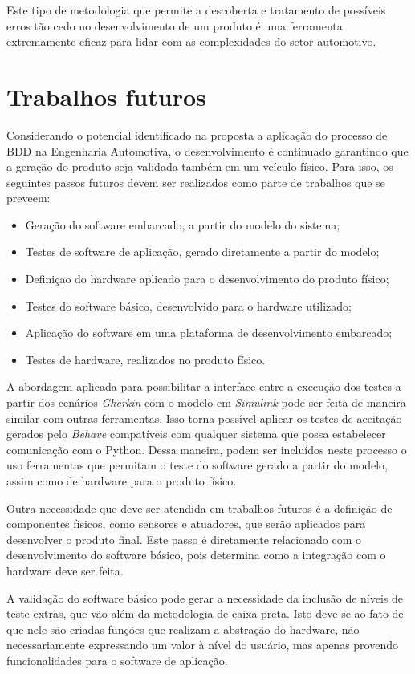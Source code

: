Este tipo de metodologia que permite a descoberta e tratamento de possíveis erros tão cedo no desenvolvimento de um produto é uma ferramenta extremamente eficaz para 
lidar com as complexidades do setor automotivo.

\section{Trabalhos futuros}

Considerando o potencial identificado na proposta a aplicação do processo de BDD na Engenharia Automotiva, o desenvolvimento é continuado garantindo que a geração do 
produto seja validada também em um veículo físico. Para isso, os seguintes passos futuros devem ser realizados como parte de trabalhos que se preveem:

\begin{itemize} 
    \item Geração do software embarcado, a partir do modelo do sistema;
    \item Testes de software de aplicação, gerado diretamente a partir do modelo;
    \item Definiçao do hardware aplicado para o desenvolvimento do produto físico;
    \item Testes do software básico, desenvolvido para o hardware utilizado;
    \item Aplicação do software em uma plataforma de desenvolvimento embarcado;
    \item Testes de hardware, realizados no produto físico.
\end{itemize}

A abordagem aplicada para possibilitar a interface entre a execução dos testes a partir dos cenários \textit{Gherkin} com o modelo em \textit{Simulink} pode 
ser feita de maneira similar com outras ferramentas. Isso torna possível aplicar os testes de aceitação gerados pelo \textit{Behave} compatíveis com qualquer 
sistema que possa estabelecer comunicação com o Python. Dessa maneira, podem ser incluídos neste processo o uso ferramentas que permitam o teste do software 
gerado a partir do modelo, assim como de hardware para o produto físico.

Outra necessidade que deve ser atendida em trabalhos futuros é a definição de componentes físicos, como sensores e atuadores, que serão aplicados para desenvolver 
o produto final. Este passo é diretamente relacionado com o desenvolvimento do software básico, pois determina como a integração com o hardware deve ser feita. 

A validação do software básico pode gerar a necessidade da inclusão de níveis de teste extras, que vão além da metodologia de caixa-preta. Isto deve-se ao fato 
de que nele são criadas funções que realizam a abstração do hardware, não necessariamente expressando um valor à nível do usuário, mas apenas provendo 
funcionalidades para o software de aplicação.
